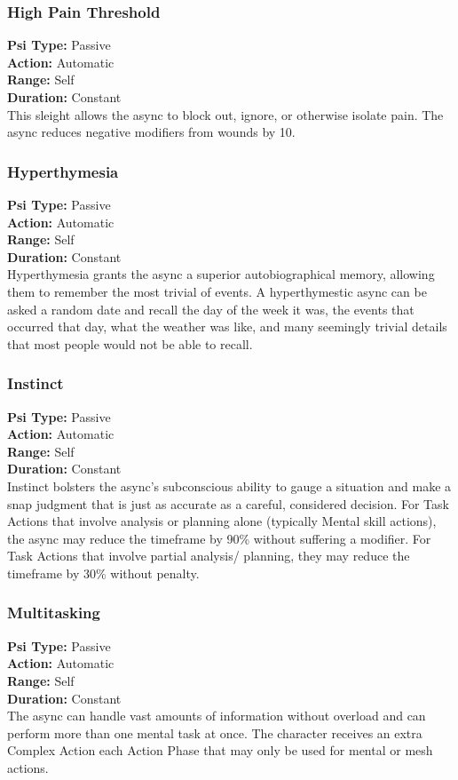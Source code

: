 \subsubsection{High Pain Threshold}
\textbf{Psi Type:} Passive \\ 
\textbf{Action:} Automatic \\ 
\textbf{Range:} Self \\ 
\textbf{Duration:} Constant \\
This sleight allows the async to block out, ignore, or
otherwise isolate pain. The async reduces negative
modifiers from wounds by 10.

\subsubsection{Hyperthymesia}
\textbf{Psi Type:} Passive \\ 
\textbf{Action:} Automatic \\ 
\textbf{Range:} Self \\ 
\textbf{Duration:} Constant \\
Hyperthymesia grants the async a superior autobiographical
memory, allowing them to remember the
most trivial of events. A hyperthymestic async can be
asked a random date and recall the day of the week
it was, the events that occurred that day, what the
weather was like, and many seemingly trivial details
that most people would not be able to recall.

\subsubsection{Instinct}
\textbf{Psi Type:} Passive \\ 
\textbf{Action:} Automatic \\ 
\textbf{Range:} Self \\ 
\textbf{Duration:} Constant \\
Instinct bolsters the async’s subconscious ability to
gauge a situation and make a snap judgment that
is just as accurate as a careful, considered decision.
For Task Actions that involve analysis or planning
alone (typically Mental skill actions), the async may
reduce the timeframe by 90\% without suffering a
modifier. For Task Actions that involve partial analysis/
planning, they may reduce the timeframe by 30\%
without penalty.

\subsubsection{Multitasking}
\textbf{Psi Type:} Passive \\ 
\textbf{Action:} Automatic \\ 
\textbf{Range:} Self \\ 
\textbf{Duration:} Constant \\
The async can handle vast amounts of information
without overload and can perform more than one
mental task at once. The character receives an extra
Complex Action each Action Phase that may only be
used for mental or mesh actions.

